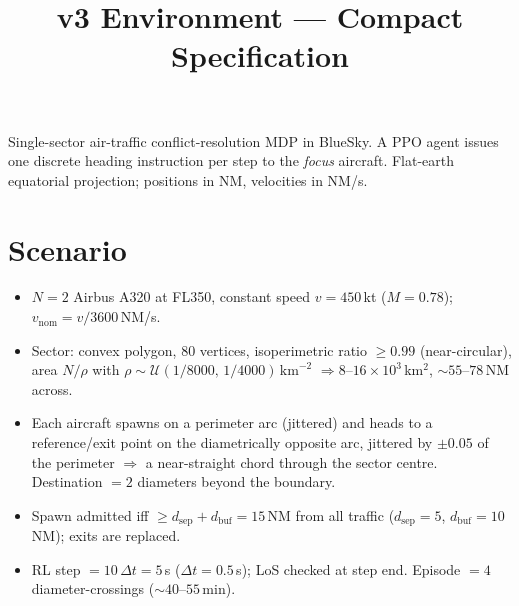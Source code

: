 \documentclass[11pt, a4paper]{article}
\title{\textbf{v3 Environment --- Compact Specification}}
\date{}
\begin{document}
\maketitle

Single-sector air-traffic conflict-resolution MDP in BlueSky. A PPO agent issues one
discrete heading instruction per step to the \emph{focus} aircraft. Flat-earth
equatorial projection; positions in NM, velocities in NM/s.

\section{Scenario}
\begin{itemize}\itemsep1pt
\item $N=2$ Airbus A320 at FL350, constant speed $v=450$\,kt ($M=0.78$); $v_\text{nom}=v/3600$\,NM/s.
\item Sector: convex polygon, $80$ vertices, isoperimetric ratio $\ge 0.99$ (near-circular),
      area $N/\rho$ with $\rho\sim\mathcal U(1/8000,\,1/4000)\,\text{km}^{-2}$
      $\Rightarrow 8$--$16\times10^3$\,km$^2$, $\sim55$--$78$\,NM across.
\item Each aircraft spawns on a perimeter arc (jittered) and heads to a reference/exit point on
      the diametrically opposite arc, jittered by $\pm0.05$ of the perimeter
      $\Rightarrow$ a near-straight chord through the sector centre. Destination $=2$ diameters
      beyond the boundary.
\item Spawn admitted iff $\ge d_\text{sep}+d_\text{buf}=15$\,NM from all traffic
      ($d_\text{sep}=5$, $d_\text{buf}=10$\,NM); exits are replaced.
\item RL step $=10\,\Delta t=5$\,s ($\Delta t=0.5$\,s); LoS checked at step end.
      Episode $=4$ diameter-crossings ($\sim40$--$55$\,min).
\end{itemize}

\end{document}
